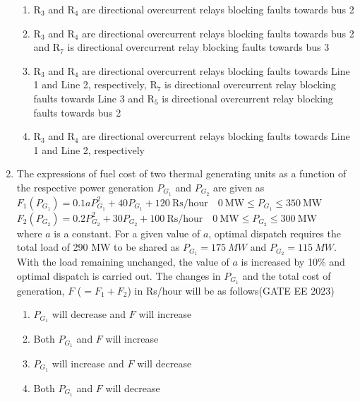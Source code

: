 \documentclass[a4paper,12pt]{exam}
\theoremstyle{remark}
\begin{document}
\begin{enumerate}
\begin{enumerate}
    \item R$_3$ and R$_4$ are directional overcurrent relays blocking faults towards bus 2
    \item R$_3$ and R$_4$ are directional overcurrent relays blocking faults towards bus 2 and R$_7$ is directional overcurrent relay blocking faults towards bus 3
    \item R$_3$ and R$_4$ are directional overcurrent relays blocking faults towards Line 1 and Line 2, respectively, R$_7$ is directional overcurrent relay blocking faults towards Line 3 and R$_5$ is directional overcurrent relay blocking faults towards bus 2
    \item R$_3$ and R$_4$ are directional overcurrent relays blocking faults towards Line 1 and Line 2, respectively
\end{enumerate}
\newpage
\item The expressions of fuel cost of two thermal generating units as a function of the respective power generation $P_{G_1}$ and $P_{G_2}$ are given as\\
$
F_1(P_{G_1}) = 0.1aP_{G_1}^2 + 40P_{G_1} + 120~\text{Rs/hour} \quad 0~\text{MW} \leq P_{G_1} \leq 350~\text{MW}
$
$
F_2(P_{G_2}) = 0.2P_{G_2}^2 + 30P_{G_2} + 100~\text{Rs/hour} \quad 0~\text{MW} \leq P_{G_2} \leq 300~\text{MW}
$\\

where $a$ is a constant. For a given value of $a$, optimal dispatch requires the total load of 290 MW to be shared as $P_{G_1} = 175~MW$ and $P_{G_2} = 115~MW$. With the load remaining unchanged, the value of $a$ is increased by 10\% and optimal dispatch is carried out. The changes in $P_{G_1}$ and the total cost of generation, $F$ ($= F_1 + F_2$) in Rs/hour will be as follows\hfill{(GATE EE 2023)}

\begin{multicols}{2}
\begin{enumerate}
    \item $P_{G_1}$ will decrease and $F$ will increase
    \item Both $P_{G_1}$ and $F$ will increase
    \item $P_{G_1}$ will increase and $F$ will decrease
    \item Both $P_{G_1}$ and $F$ will decrease
\end{enumerate}
\end{multicols}


\end{enumerate}
\end{document}
